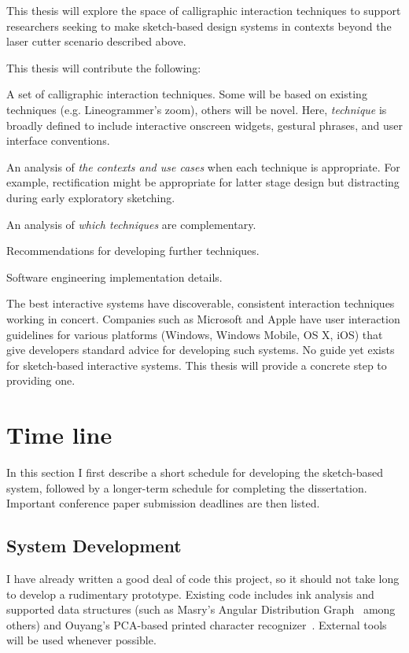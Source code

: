\documentclass[12pt]{article}
\newenvironment{packed_enum}{
\begin{enumerate}
  \setlength{\itemsep}{1pt}
  \setlength{\parskip}{0pt}
  \setlength{\parsep}{0pt}
}{\end{enumerate}}
\begin{document}
This thesis will explore the space of calligraphic interaction
techniques to support researchers seeking to make sketch-based design
systems in contexts beyond the laser cutter scenario described above.

This thesis will contribute the following:
\begin{packed_enum}
\item A set of calligraphic interaction techniques. Some will be based
  on existing techniques (e.g. Lineogrammer's zoom), others will be
  novel. Here, \textit{technique} is broadly defined to include
  interactive onscreen widgets, gestural phrases, and user interface
  conventions.
\item An analysis of \textit{the contexts and use cases} when each
  technique is appropriate. For example, rectification might be
  appropriate for latter stage design but distracting during early
  exploratory sketching.
\item An analysis of \textit{which techniques} are complementary.
\item Recommendations for developing further techniques.
\item Software engineering implementation details.
\end{packed_enum}

The best interactive systems have discoverable, consistent interaction
techniques working in concert. Companies such as Microsoft and Apple
have user interaction guidelines for various platforms (Windows,
Windows Mobile, OS X, iOS) that give developers standard advice for
developing such systems. No guide yet exists for sketch-based
interactive systems. This thesis will provide a concrete step to
providing one.

\section{Time line}

In this section I first describe a short schedule for developing the
sketch-based system, followed by a longer-term schedule for completing
the dissertation. Important conference paper submission deadlines are
then listed.

\subsection{System Development}
\label{sec:system-development-schedule}

I have already written a good deal of code this project, so it should
not take long to develop a rudimentary prototype. Existing code
includes ink analysis and supported data structures (such as Masry's
Angular Distribution Graph~\cite{masry-3d-sketch} among others) and
Ouyang's PCA-based printed character
recognizer~\cite{ouyang-visual-recog}. External tools will be used
whenever possible.
\end{document}
